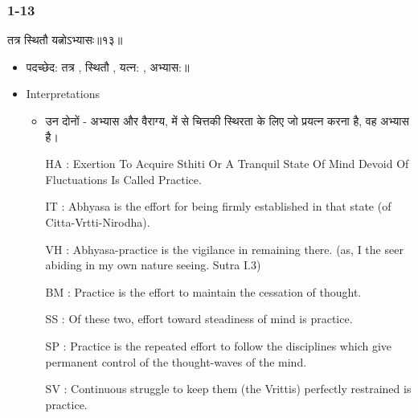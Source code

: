 \begin{frame}[fragile]\frametitle{1-13}
\begin{sanskrit}
तत्र स्थितौ यत्नोऽभ्यासः॥१३॥
\end{sanskrit}

	\begin{itemize}
	\item पदच्छेद: तत्र , स्थितौ , यत्न: , अभ्यास:॥
	\item Interpretations
		\begin{itemize}	
		\item उन दोनों - अभ्यास और वैराग्य, में से चित्तकी स्थिरता के लिए जो प्रयत्न करना है, वह अभ्यास है।
		\item [HA]: Exertion To Acquire Sthiti Or A Tranquil State Of Mind Devoid Of Fluctuations Is Called Practice.
		\item [IT]: Abhyasa is the effort for being firmly established in that state (of Citta-Vrtti-Nirodha).
		\item [VH]: Abhyasa-practice is the vigilance in remaining there. (as, I the seer abiding in my own nature seeing. Sutra I.3)
		\item [BM]: Practice is the effort to maintain the cessation of thought.
		\item [SS]: Of these two, effort toward steadiness of mind is practice.
		\item [SP]: Practice is the repeated effort to follow the disciplines which give permanent control of the thought-waves of the mind.
		\item [SV]: Continuous struggle to keep them (the Vrittis) perfectly restrained is practice. 
		\end{itemize}
	\end{itemize}
	
\end{frame}

